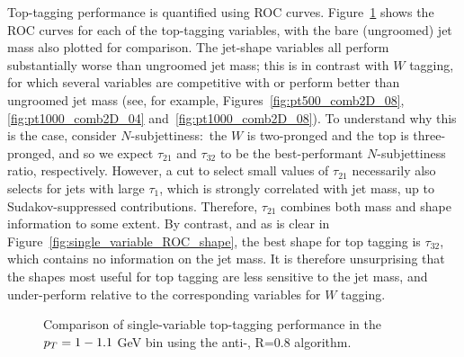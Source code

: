 Top-tagging performance is quantified using ROC curves. Figure~\ref{fig:single_variable_ROC} shows the ROC curves for each of the top-tagging variables, with the bare (ungroomed) jet mass also plotted for comparison. The jet-shape variables all perform substantially worse than ungroomed jet mass; this is in contrast with $W$ tagging, for which several variables are competitive with or perform better than ungroomed jet mass (see, for example, Figures~\ref{fig:pt500_comb2D_08}, \ref{fig:pt1000_comb2D_04} and~\ref{fig:pt1000_comb2D_08}).
To understand why this is the case, consider $N$-subjettiness:~the $W$ is two-pronged and the top is three-pronged, and so we expect $\tau_{21}$ and $\tau_{32}$ to be the best-performant $N$-subjettiness ratio, respectively. However, a cut to select small values of $\tau_{21}$  necessarily also selects for 
jets with large $\tau_1$, which is strongly correlated with jet mass, up to Sudakov-suppressed contributions. Therefore, $\tau_{21}$ combines both mass and shape information to some extent. By contrast, and as is clear in Figure~\ref{fig:single_variable_ROC_shape}, the best shape for top tagging is $\tau_{32}$, which contains no information on the jet mass. It is therefore unsurprising that the  shapes most useful for top tagging are less sensitive to the jet mass, and under-perform relative to the corresponding variables for $W$ tagging.

\begin{figure}
\centering
{}
\caption{Comparison of single-variable top-tagging performance in the $p_T= 1-1.1$ GeV bin using the anti-\kT, R=0.8 algorithm.}
\label{fig:single_variable_ROC}
\end{figure}

